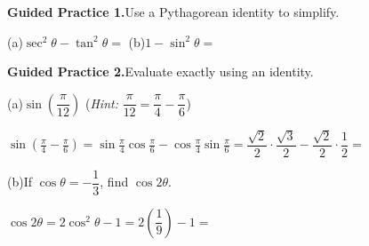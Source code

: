 \documentclass[10pt]{article}
\begin{document}
\begin{practicebox}

\textbf{Guided Practice 1.}\quad Use a Pythagorean identity to simplify.

\vspace{4pt}
(a)\quad $\sec^2\theta - \tan^2\theta = $ 
\hspace{1cm}
(b)\quad $1 - \sin^2\theta = $ \ans{$\cos^2\theta$}

\vspace{0.10in}
\textbf{Guided Practice 2.}\quad Evaluate exactly using an identity.

\vspace{4pt}
(a)\quad $\sin\!\left(\dfrac{\pi}{12}\right)$
\quad(\textit{Hint:} $\dfrac{\pi}{12} = \dfrac{\pi}{4} - \dfrac{\pi}{6}$)

\vspace{4pt}
$\sin\!\left(\tfrac{\pi}{4} - \tfrac{\pi}{6}\right)
= \sin\tfrac{\pi}{4}\cos\tfrac{\pi}{6} - \cos\tfrac{\pi}{4}\sin\tfrac{\pi}{6}
= \dfrac{\sqrt{2}}{2}\cdot\dfrac{\sqrt{3}}{2} - \dfrac{\sqrt{2}}{2}\cdot\dfrac{1}{2}
= $ 

\vspace{8pt}
(b)\quad If $\cos\theta = -\dfrac{1}{3}$, find $\cos 2\theta$.

\vspace{4pt}
$\cos 2\theta = 2\cos^2\theta - 1 = 2\!\left(\dfrac{1}{9}\right) - 1 = $ 

\end{practicebox}
\end{document}

